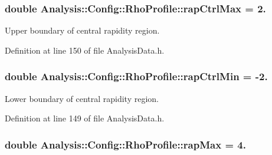 \subsubsection[{\texorpdfstring{rap\+Ctrl\+Max}{rapCtrlMax}}]{\setlength{\rightskip}{0pt plus 5cm}double Analysis\+::\+Config\+::\+Rho\+Profile\+::rap\+Ctrl\+Max = 2.\hspace{0.3cm}{\ttfamily [static]}}\hypertarget{namespaceAnalysis_1_1Config_1_1RhoProfile_ab78a2585916e0761da7090b86d5c762b}{}\label{namespaceAnalysis_1_1Config_1_1RhoProfile_ab78a2585916e0761da7090b86d5c762b}


Upper boundary of central rapidity region. 



Definition at line 150 of file Analysis\+Data.\+h.

\subsubsection[{\texorpdfstring{rap\+Ctrl\+Min}{rapCtrlMin}}]{\setlength{\rightskip}{0pt plus 5cm}double Analysis\+::\+Config\+::\+Rho\+Profile\+::rap\+Ctrl\+Min = -\/2.\hspace{0.3cm}{\ttfamily [static]}}\hypertarget{namespaceAnalysis_1_1Config_1_1RhoProfile_a6a12ebe70b6648825eead16dff1159fd}{}\label{namespaceAnalysis_1_1Config_1_1RhoProfile_a6a12ebe70b6648825eead16dff1159fd}


Lower boundary of central rapidity region. 



Definition at line 149 of file Analysis\+Data.\+h.

\subsubsection[{\texorpdfstring{rap\+Max}{rapMax}}]{\setlength{\rightskip}{0pt plus 5cm}double Analysis\+::\+Config\+::\+Rho\+Profile\+::rap\+Max = 4.\hspace{0.3cm}{\ttfamily [static]}}\hypertarget{namespaceAnalysis_1_1Config_1_1RhoProfile_aee14811464e345a118e1e64077014c2d}{}\label{namespaceAnalysis_1_1Config_1_1RhoProfile_aee14811464e345a118e1e64077014c2d}


